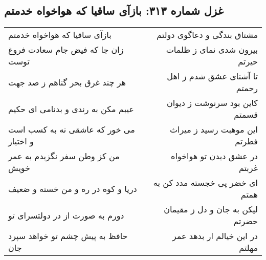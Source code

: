 \begin{center}
\section*{غزل شماره ۳۱۳: بازآی ساقیا که هواخواه خدمتم}
\label{sec:sh313}
\begin{longtable}{l p{0.5cm} r}
بازآی ساقیا که هواخواه خدمتم
&&
مشتاق بندگی و دعاگوی دولتم
\\
زان جا که فیض جام سعادت فروغ توست
&&
بیرون شدی نمای ز ظلمات حیرتم
\\
هر چند غرق بحر گناهم ز صد جهت
&&
تا آشنای عشق شدم ز اهل رحمتم
\\
عیبم مکن به رندی و بدنامی ای حکیم
&&
کاین بود سرنوشت ز دیوان قسمتم
\\
می خور که عاشقی نه به کسب است و اختیار
&&
این موهبت رسید ز میراث فطرتم
\\
من کز وطن سفر نگزیدم به عمر خویش
&&
در عشق دیدن تو هواخواه غربتم
\\
دریا و کوه در ره و من خسته و ضعیف
&&
ای خضر پی خجسته مدد کن به همتم
\\
دورم به صورت از در دولتسرای تو
&&
لیکن به جان و دل ز مقیمان حضرتم
\\
حافظ به پیش چشم تو خواهد سپرد جان
&&
در این خیالم ار بدهد عمر مهلتم
\\
\end{longtable}
\end{center}
